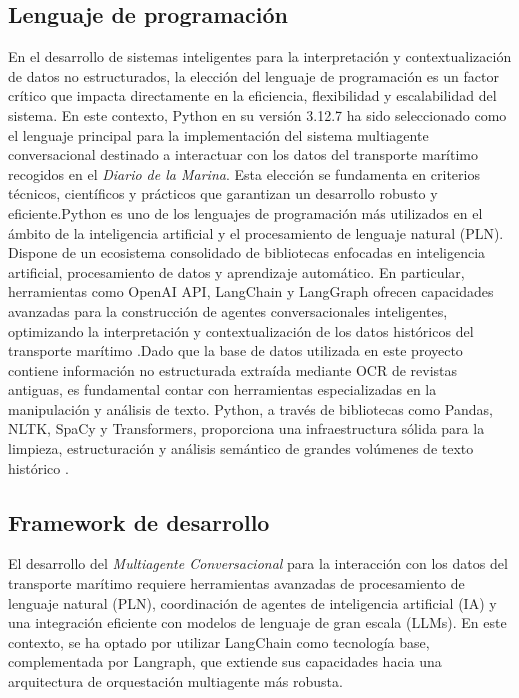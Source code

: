 \subsection{Lenguaje de programación}


En el desarrollo de sistemas inteligentes para la interpretación y contextualización de datos no estructurados, la elección del lenguaje de programación es un factor crítico que impacta directamente en la eficiencia, flexibilidad y escalabilidad del sistema. En este contexto, Python en su versión 3.12.7 ha sido seleccionado como el lenguaje principal para la implementación del sistema multiagente conversacional destinado a interactuar con los datos del transporte marítimo recogidos en el \textit{Diario de la Marina}. Esta elección se fundamenta en criterios técnicos, científicos y prácticos que garantizan un desarrollo robusto y eficiente.Python es uno de los lenguajes de programación más utilizados en el ámbito de la inteligencia artificial y el procesamiento de lenguaje natural (PLN). Dispone de un ecosistema consolidado de bibliotecas enfocadas en inteligencia artificial, procesamiento de datos y aprendizaje automático. En particular, herramientas como OpenAI API, LangChain y LangGraph ofrecen capacidades avanzadas para la construcción de agentes conversacionales inteligentes, optimizando la interpretación y contextualización de los datos históricos del transporte marítimo \cite{langchain2023langgraph}.Dado que la base de datos utilizada en este proyecto contiene información no estructurada extraída mediante OCR de revistas antiguas, es fundamental contar con herramientas especializadas en la manipulación y análisis de texto. Python, a través de bibliotecas como Pandas, NLTK, SpaCy y Transformers, proporciona una infraestructura sólida para la limpieza, estructuración y análisis semántico de grandes volúmenes de texto histórico \cite{bird2009natural, spacy2023nlp}.


\subsection{Framework de desarrollo}

El desarrollo del \textit{Multiagente Conversacional} para la interacción con los datos del transporte marítimo requiere herramientas avanzadas de procesamiento de lenguaje natural (PLN), coordinación de agentes de inteligencia artificial (IA) y una integración eficiente con modelos de lenguaje de gran escala (LLMs). En este contexto, se ha optado por utilizar LangChain como tecnología base, complementada por Langraph, que extiende sus capacidades hacia una arquitectura de orquestación multiagente más robusta.

